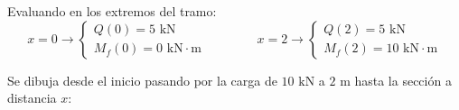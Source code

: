 Evaluando en los extremos del tramo:
\begin{equation}
    x = 0 \longrightarrow \begin{cases} Q(0) = 5\text{ kN} \\ M_f(0) = 0\text{ kN}\cdot\text{m} \end{cases}
    \qquad\qquad
    x = 2 \longrightarrow \begin{cases} Q(2) = 5\text{ kN} \\ M_f(2) = 10\text{ kN}\cdot\text{m} \end{cases}
\end{equation}


Se dibuja desde el inicio pasando por la carga de $10\text{ kN}$ a $2\text{ m}$ hasta la sección a distancia $x$:

